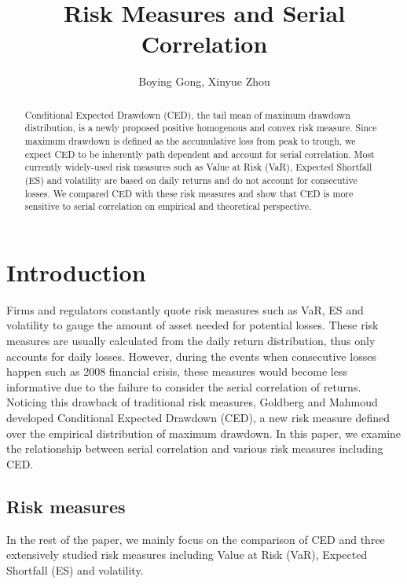\documentclass[11pt]{article}
\title{Risk Measures and Serial Correlation}
\author{Boying Gong, Xinyue Zhou}
\begin{document}
\maketitle



\begin{abstract}
Conditional Expected Drawdown (CED), the tail mean of maximum drawdown distribution, is a newly proposed positive homogenous and convex risk measure. Since maximum drawdown is defined as the accumulative loss from peak to trough, we expect CED to be inherently path dependent and account for serial correlation. Most currently widely-used risk measures such as Value at Risk (VaR), Expected Shortfall (ES) and volatility are based on daily returns and do not account for consecutive losses. We compared CED with these risk measures and show that CED is more sensitive to serial correlation on empirical and theoretical perspective. 
\end{abstract}

\section{Introduction}

Firms and regulators constantly quote risk measures such as VaR, ES and volatility to gauge the amount of asset needed for potential losses. These risk measures are usually calculated from the daily return distribution, thus only accounts for daily losses. However, during the events when consecutive losses happen such as 2008 financial crisis, these measures would become less informative due to the failure to consider the serial correlation of returns. Noticing this drawback of traditional risk measures, Goldberg and Mahmoud\cite{goldberg2014convex} developed Conditional Expected Drawdown (CED), a new risk measure defined over the empirical distribution of maximum drawdown. In this paper, we examine the relationship between serial correlation and various risk measures including CED. 

\subsection{Risk measures}

In the rest of the paper, we mainly focus on the comparison of CED and three extensively studied risk measures including Value at Risk (VaR), Expected Shortfall (ES) and volatility.
\end{document}

